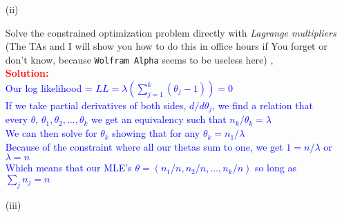 \documentclass[12pt]{article}
\begin{document}
\begin{itemize}
\begin{itemize}
\begin{itemize}
\item[(ii)]

Solve the constrained optimization problem directly with \textit{Lagrange multipliers} (The TAs and I will show you how to do this in office hours if You forget or don't know, because \texttt{Wolfram Alpha} seems to be useless here) \fbox{\textbf{\textit{[10 points]}}}, \vspace*{0.025in} \\
\textcolor{red}{\textbf{Solution:}} \\
\textcolor{blue}{Our log likelihood = \( LL = \lambda(\sum_{j=1}^{k} (\theta_j - 1)) = 0 \)
\\
If we take partial derivatives of both sides, \( d/d\theta_j \), we find a relation that every \( \theta \), \( \theta_1, \theta_2, ..., \theta_k \) we get an equivalency such that \( n_k/\theta_k = \lambda \)
\\
We can then solve for \( \theta_k \) showing that for any \( \theta_k = n_1/\lambda \)
\\
Because of the constraint where all our thetas sum to one, we get \( 1 = n/\lambda \) or \( \lambda = n \)
\\
Which means that our MLE’s \( \theta = (n_1/n, n_2/n, ..., n_k/n) \) so long as \( \sum_{j} n_j = n \)}

\item[(iii)]


\end{itemize}
\end{itemize}
\end{itemize}
\end{document}
